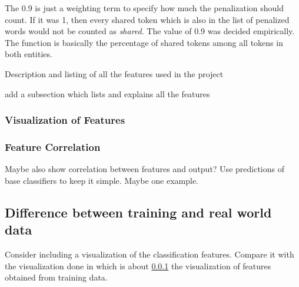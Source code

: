 \documentclass[epsfig,a4paper,11pt,titlepage,twoside,openany]{book}
\begin{document}
The 0.9 is just a weighting term to specify how much the penalization should count. If it was 1, then every shared token which is also in the list of penalized words would not be counted as \textit{shared}. The value of 0.9 was decided empirically. The function is basically the percentage of shared tokens among all tokens in both entities.





Description and listing of all the features used in the project

add a subsection which lists and explains all the features


\subsubsection{Visualization of Features}
\label{sec:feature-viz}

\subsubsection{Feature Correlation}
\label{sec:feature-correlation}

Maybe also show correlation between features and output? Use predictions of base
classifiers to keep it simple. Maybe one example.

\subsection{Difference between training and real world data}
\label{sec:training-real-data-difference}

Consider including a visualization of the classification features. Compare it
with the visualization done in \pageref{sec:feature-viz} which is about
\ref{sec:feature-viz} the visualization of features obtained from training data.





\end{document}
